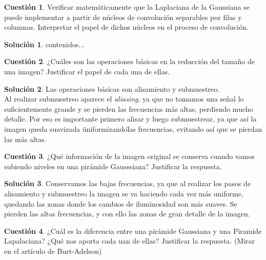 \documentclass[a4paper, 11pt]{article}
\theoremstyle{definition}
\newtheorem{cuestion}{Cuestión}
\newtheorem*{solucion}{Solución}
\begin{document}
  \begin{cuestion}
     	Verificar matemáticamente que la Laplaciana de la Gaussiana se puede implementar
       a partir de núcleos de convolución separables por filas y columnas.
       Interpretar el papel de dichos núcleos en el proceso de convolución.

  \end{cuestion}

  \begin{solucion}
     	contenidos...
  \end{solucion}


  \begin{cuestion}
     	 ¿Cuáles son las operaciones básicas en la reducción del tamaño de una imagen? Justificar el papel de cada una de ellas.

  \end{cuestion}

  \begin{solucion}
     	Las operaciones básicas son alisamiento y submuestreo.\\

      Al realizar submuestreo aparece el \textit{aliasing}, ya que no tomamos una
      señal lo suficientemente grande y se pierden las frecuencias más altas,
      perdiendo mucho detalle. Por eso es importante primero alisar y luego submuestrear,
      ya que así la imagen queda suavizada \"uniformizando\" las frecuencias, evitando
      así que se pierdan las más altas.
  \end{solucion}
  \begin{cuestion}
     	¿Qué información de la imagen original se conserva cuando vamos
      subiendo niveles en una pirámide Gausssiana? Justificar la respuesta.

  \end{cuestion}

  \begin{solucion}
     	Conservamos las bajas frecuencias, ya que al realizar los pasos de alisamiento
      y submuestreo la imagen se va haciendo cada vez más uniforme, quedando
      las zonas donde los cambios de iluminosidad son más suaves. Se pierden
      las altas frecuencias, y con ello las zonas de gran detalle de la imagen.
  \end{solucion}
  \begin{cuestion}
     	¿Cuál es la diferencia entre una pirámide Gaussiana y una Piramide
      Lapalaciana? ¿Qué nos aporta cada uan de ellas? Justificar la respuesta.
      (Mirar en el artículo de Burt-Adelson)

  \end{cuestion}
\end{document}

